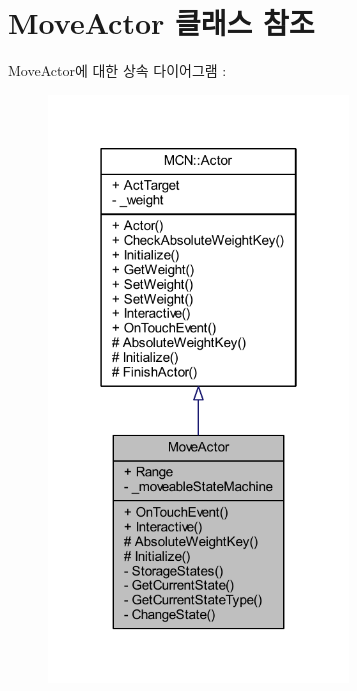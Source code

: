 \hypertarget{class_move_actor}{}\section{Move\+Actor 클래스 참조}
\label{class_move_actor}


Move\+Actor에 대한 상속 다이어그램 \+: \nopagebreak
\begin{figure}[H]
\begin{center}
\leavevmode
\includegraphics[width=226pt]{class_move_actor__inherit__graph}
\end{center}
\end{figure}



